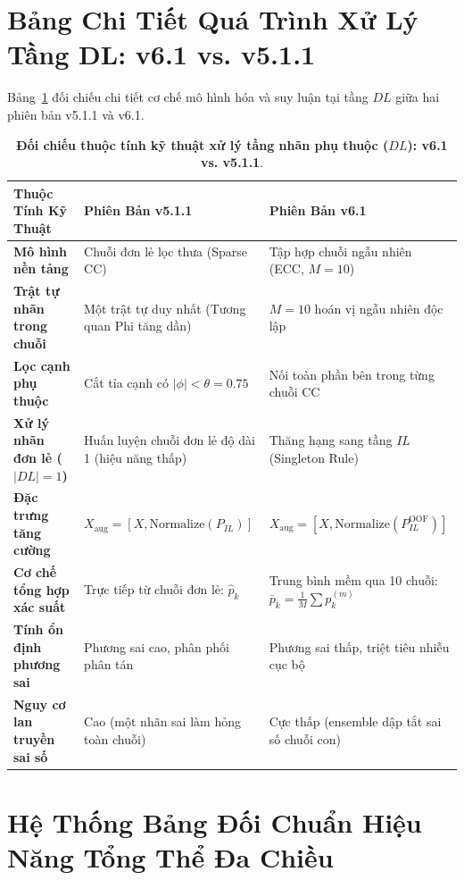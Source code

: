 \documentclass[11pt,a4paper]{article}
\begin{document}
\section{Bảng Chi Tiết Quá Trình Xử Lý Tầng DL: v6.1 vs. v5.1.1}

Bảng~\ref{tab:dl_comparison} đối chiếu chi tiết cơ chế mô hình hóa và suy luận tại tầng $DL$ giữa hai phiên bản v5.1.1 và v6.1.

\begin{table}[H]
\centering
\small
\caption{\textbf{Đối chiếu thuộc tính kỹ thuật xử lý tầng nhãn phụ thuộc ($DL$): v6.1 vs. v5.1.1}.}
\label{tab:dl_comparison}
\begin{tabular}{p{3.8cm} p{5.5cm} p{5.5cm}}
\toprule
\textbf{Thuộc Tính Kỹ Thuật} & \textbf{Phiên Bản v5.1.1} & \textbf{Phiên Bản v6.1} \\
\midrule
\textbf{Mô hình nền tảng} & Chuỗi đơn lẻ lọc thưa (Sparse CC) & Tập hợp chuỗi ngẫu nhiên (ECC, $M=10$) \\
\addlinespace
\textbf{Trật tự nhãn trong chuỗi} & Một trật tự duy nhất (Tương quan Phi tăng dần) & $M=10$ hoán vị ngẫu nhiên độc lập \\
\addlinespace
\textbf{Lọc cạnh phụ thuộc} & Cắt tỉa cạnh có $|\phi| < \theta = 0.75$ & Nối toàn phần bên trong từng chuỗi CC \\
\addlinespace
\textbf{Xử lý nhãn đơn lẻ ($|DL|=1$)} & Huấn luyện chuỗi đơn lẻ độ dài 1 (hiệu năng thấp) & Thăng hạng sang tầng $IL$ (Singleton Rule) \\
\addlinespace
\textbf{Đặc trưng tăng cường} & $X_{\text{aug}} = [X, \text{Normalize}(P_{IL})]$ & $X_{\text{aug}} = [X, \text{Normalize}(P_{IL}^{\text{OOF}})]$ \\
\addlinespace
\textbf{Cơ chế tổng hợp xác suất} & Trực tiếp từ chuỗi đơn lẻ: $\hat{p}_k$ & Trung bình mềm qua 10 chuỗi: $\bar{p}_k = \frac{1}{M}\sum p_k^{(m)}$ \\
\addlinespace
\textbf{Tính ổn định phương sai} & Phương sai cao, phân phối phân tán & Phương sai thấp, triệt tiêu nhiễu cục bộ \\
\addlinespace
\textbf{Nguy cơ lan truyền sai số} & Cao (một nhãn sai làm hỏng toàn chuỗi) & Cực thấp (ensemble dập tắt sai số chuỗi con) \\
\bottomrule
\end{tabular}
\end{table}

\section{Hệ Thống Bảng Đối Chuẩn Hiệu Năng Tổng Thể Đa Chiều}
\end{document}
